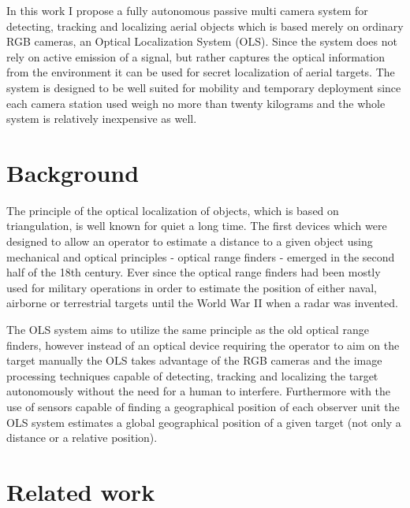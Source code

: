 In this work I propose a fully autonomous passive multi camera system for detecting, tracking and localizing aerial objects which is based merely on ordinary RGB cameras, an Optical Localization System (OLS). Since the system does not rely on active emission of a signal, but rather captures the optical information from the environment it can be used for secret localization of aerial targets. The system is designed to be well suited for mobility and temporary deployment since each camera station used weigh no more than twenty kilograms and the whole system is relatively inexpensive as well.


\section{Background} \label{txt:background}

The principle of the optical localization of objects, which is based on triangulation, is well known for quiet a long time. The first devices which were designed to allow an operator to estimate a distance to a given object using mechanical and optical principles - optical range finders - emerged in the second half of the 18th century\cite{bud1998instruments}. Ever since the optical range finders had been mostly used for military operations in order to estimate the position of either naval, airborne or terrestrial targets until the World War II when a radar was invented.

The OLS system aims to utilize the same principle as the old optical range finders, however instead of an optical device requiring the operator to aim on the target manually the OLS takes advantage of the RGB cameras and the image processing techniques capable of detecting, tracking and localizing the target autonomously without the need for a human to interfere. Furthermore with the use of sensors capable of finding a geographical position of each observer unit the OLS system estimates a global geographical position of a given target (not only a distance or a relative position).


\section{Related work}

